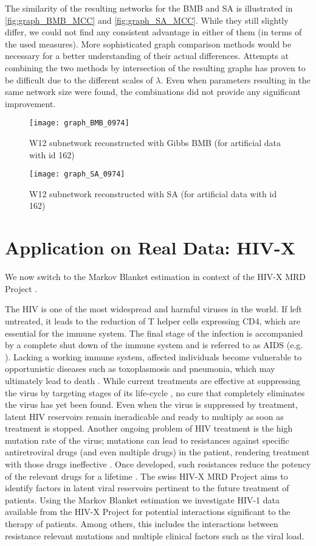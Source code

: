 The similarity of the resulting networks for the BMB and SA is illustrated in \autoref{fig:graph_BMB_MCC} and \autoref{fig:graph_SA_MCC}.
While they still slightly differ, we could not find any consistent advantage in either of them (in terms of the used measures).
More sophisticated graph comparison methods would be necessary for a better understanding of their actual differences.
Attempts at combining the two methods by intersection of the resulting graphs has proven to be difficult due to the different scales of $\lambda$.
Even when parameters resulting in the same network size were found, the combinations did not provide any significant improvement.
\begin{figure}
	\centering
	\texttt{[image: graph\_BMB\_0974]}
	\caption{W12 subnetwork reconstructed with Gibbs BMB (for artificial data with id 162)}
	\label{fig:graph_BMB_MCC}
\end{figure}
\begin{figure}
	\centering
	\texttt{[image: graph\_SA\_0974]}
	\caption{W12 subnetwork reconstructed with SA (for artificial data with id 162)}
	\label{fig:graph_SA_MCC}
\end{figure}


\FloatBarrier
\section{Application on Real Data: HIV-X}
We now switch to the Markov Blanket estimation in context of the HIV-X MRD Project \citep{HIVX}.

The \gls{HIV} is one of the most widespread and harmful viruses in the world.
If left untreated, it leads to the reduction of T helper cells expressing CD4, which are essential for the immune system.
The final stage of the infection is accompanied by a complete shut down of the immune system and is referred to as \gls{AIDS} (e.g. \cite{alimonti2003mechanisms}). 
Lacking a working immune system, affected individuals become vulnerable to opportunistic diseases such as toxoplasmosis and pneumonia, which may ultimately lead to death \citep{chaisson1998impact}.
While current treatments are effective at suppressing the virus by targeting stages of its life-cycle \citep{bartlett2001overview}, no cure that completely eliminates the virus has yet been found.
Even when the virus is suppressed by treatment, latent HIV reservoirs remain ineradicable and ready to multiply as soon as treatment is stopped.
Another ongoing problem of HIV treatment is the high mutation rate of the virus; 
mutations can lead to resistances against specific antiretroviral drugs (and even multiple drugs) in the patient, rendering treatment with those drugs ineffective \citep{wainberg1998public}.
Once developed, such resistances reduce the potency of the relevant drugs for a lifetime \citep{noe2005latent}.
The swiss HIV-X MRD Project \citep{HIVX} aims to identify factors in latent viral reservoirs pertinent to the future treatment of patients.
Using the Markov Blanket estimation we investigate HIV-1 data available from the HIV-X Project
for potential interactions significant to the therapy of patients.
Among others, this includes the interactions between resistance relevant mutations and multiple clinical factors such as the viral load.

